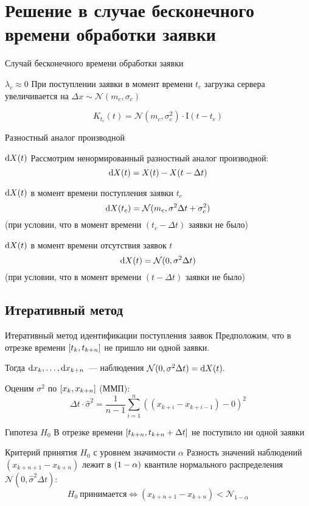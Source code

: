 \documentclass[utf8]{beamer}
\begin{document}
\section[$\lambda_c \approx 0$]{Решение в случае бесконечного времени обработки заявки}
\begin{frame}{Случай бесконечного времени обработки заявки}
\begin{block}{$\lambda_c \approx 0$}
  При поступлении заявки в момент времени $t_c$ загрузка сервера увеличивается на 
  $\Delta x \sim \mathcal{N}(m_c, \sigma_c)$

  $$K_{t_c}(t) = \mathcal{N}(m_c, \sigma_c^2) \cdot \mathrm{I}(t - t_c)$$
\end{block}
\end{frame}


\begin{frame}{Разностный аналог производной}
\begin{block}{$\dif X(t)$}
  Рассмотрим ненормированный разностный аналог производной:
  $$\dif X(t) = X(t) - X(t - \Delta t)$$
\end{block}
\begin{block}{$\dif X(t)$ в момент времени поступления заявки $t_c$}
  $$\dif X(t_c) = \mathcal{N}(m_c, \sigma^2 \Delta t + \sigma_c^2)$$
  (при условии, что в момент времени $(t_c - \Delta t)$ заявки не было)
\end{block}
\begin{block}{$\dif X(t)$ в момент времени отсутствия заявок $t$}
  $$\dif X(t) = \mathcal{N}(0, \sigma^2 \Delta t)$$
  (при условии, что в момент времени $(t - \Delta t)$ заявки не было)
\end{block}
\end{frame}


\subsection{Итеративный метод}
\begin{frame}{Итеративный метод идентификации поступления заявок}
Предположим, что в отрезке времени $\sbr{t_k, t_{k+n}}$ не пришло ни одной заявки.

Тогда $\dif x_k, \dots, \dif x_{k+n}$~--- наблюдения 
$\mathcal{N}(0, \sigma^2 \Delta t) = \dif X(t).$

Оценим $\sigma^2$ по $\sbr{x_k, x_{k+n}}$ (ММП):
$$\Delta t \cdot \widehat{\sigma}^2 = 
    \frac{1}{n-1}
        \sum\limits_{i=1}^n ((x_{k+i} - x_{k+i-1}) - 0)^2$$

\begin{block}{Гипотеза $H_0$}
  В отрезке времени $\sbr{t_{k+n}, t_{k+n} + \Delta t}$ не поступило ни 
  одной заявки
\end{block}
\begin{block}{Критерий принятия $H_0$ с уровнем значимости $\alpha$}
Разность значений наблюдений $(x_{k+n+1}-x_{k+n})$
лежит в $\del{1 - \alpha}$ квантиле
нормального распределения $\mathcal{N}(0, \widehat{\sigma}^2 \Delta t)$:
$$
H_0 \  \mathrm{\text{принимается}} \iff
        (x_{k+n+1}-x_{k+n}) < 
	    \mathcal{N}_{1 - \alpha}
$$
\end{block}
\end{frame}
\end{document}
